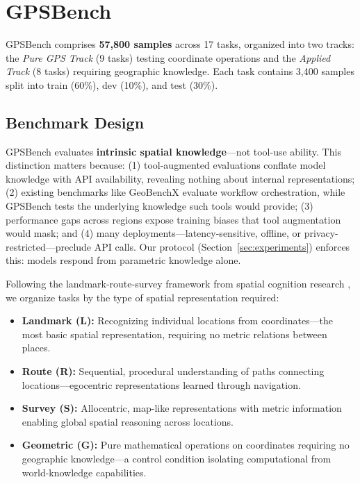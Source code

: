 \section{GPSBench}
\label{sec:gpsbench}

GPSBench comprises \textbf{57,800 samples} across 17 tasks, organized into two tracks: the \textit{Pure GPS Track} (9 tasks) testing coordinate operations and the \textit{Applied Track} (8 tasks) requiring geographic knowledge. Each task contains 3,400 samples split into train (60\%), dev (10\%), and test (30\%).

\subsection{Benchmark Design}
\label{sec:benchmark}

GPSBench evaluates \textbf{intrinsic spatial knowledge}---not tool-use ability. This distinction matters because: (1) tool-augmented evaluations conflate model knowledge with API availability, revealing nothing about internal representations; (2) existing benchmarks like GeoBenchX \citep{krechetova2025geobenchx} evaluate workflow orchestration, while GPSBench tests the underlying knowledge such tools would provide; (3) performance gaps across regions expose training biases that tool augmentation would mask; and (4) many deployments---latency-sensitive, offline, or privacy-restricted---preclude API calls. Our protocol (Section~\ref{sec:experiments}) enforces this: models respond from parametric knowledge alone.

Following the landmark-route-survey framework from spatial cognition research \citep{siegel1975development}, we organize tasks by the type of spatial representation required:

\begin{itemize}[leftmargin=*, itemsep=2pt]
    \item \textbf{Landmark (L):} Recognizing individual locations from coordinates---the most basic spatial representation, requiring no metric relations between places.
    \item \textbf{Route (R):} Sequential, procedural understanding of paths connecting locations---egocentric representations learned through navigation.
    \item \textbf{Survey (S):} Allocentric, map-like representations with metric information enabling global spatial reasoning across locations.
    \item \textbf{Geometric (G):} Pure mathematical operations on coordinates requiring no geographic knowledge---a control condition isolating computational from world-knowledge capabilities.
\end{itemize}

